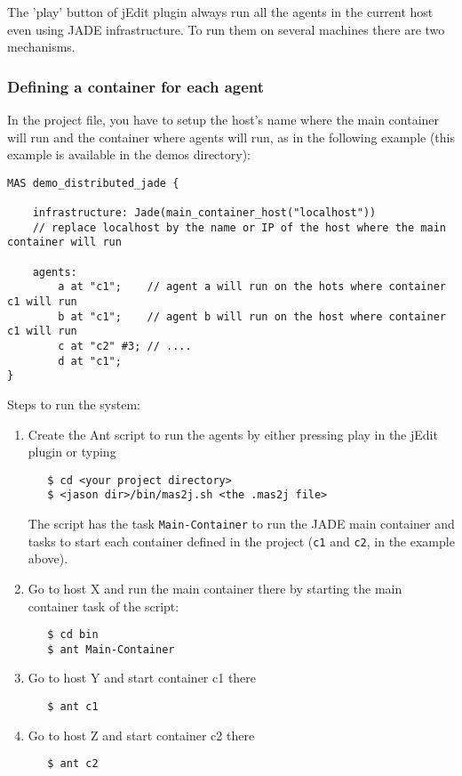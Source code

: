 \documentclass{article}
\begin{document}
\begin{description}
The 'play' button of jEdit plugin always run all the agents in the
current host even using JADE infrastructure. To run them on several
machines there are two mechanisms.

\subsubsection{Defining a container for each agent}

In the project file, you have to setup the host's name where the main
container will run and the container where agents will run, as in
the following example (this example is available in the demos
directory):
\begin{verbatim}
MAS demo_distributed_jade {

    infrastructure: Jade(main_container_host("localhost")) 
	// replace localhost by the name or IP of the host where the main container will run

    agents:
        a at "c1";    // agent a will run on the hots where container c1 will run
        b at "c1";    // agent b will run on the host where container c1 will run
        c at "c2" #3; // ....
        d at "c1";
}
\end{verbatim}

Steps to run the system:
\begin{enumerate}
\item Create the Ant script to run the agents by either pressing play in
  the jEdit plugin or typing
\begin{verbatim}
   $ cd <your project directory>
   $ <jason dir>/bin/mas2j.sh <the .mas2j file>
\end{verbatim}

  The script has the task \texttt{Main-Container} to run the JADE main
  container and tasks to start each container defined in the
  project (\texttt{c1} and \texttt{c2}, in the example above).

\item Go to host X and run the main container there by starting the
  main container task of the script:
\begin{verbatim}
   $ cd bin
   $ ant Main-Container
\end{verbatim}

\item Go to host Y and start container c1 there
\begin{verbatim}
   $ ant c1
\end{verbatim}

\item Go to host Z and start container c2 there
\begin{verbatim}
   $ ant c2
\end{verbatim}
\end{enumerate}



\end{description}
\end{document}

